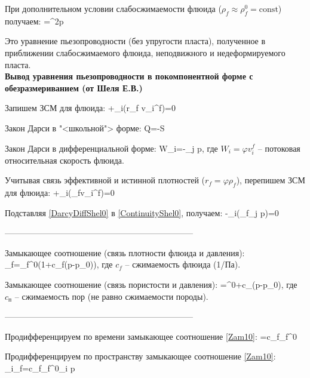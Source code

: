 \documentclass[main.tex]{subfiles}
\begin{document}
При дополнительном условии слабосжимаемости флюида ($\rho_f\approx\rho_f^0=\textrm{const}$) получаем:
\beq
{}=\pmb{\nabla}^2p
\eeq

Это уравнение пьезопроводности (без упругости пласта), полученное в приближении слабосжимаемого флюида, неподвижного и недеформируемого пласта.
\\

\textbf{Вывод уравнения пьезопроводности в покомпонентной форме с обезразмериванием (от Шеля Е.В.)}

Запишем ЗСМ для флюида:
\beq
{}+\partial_i\left(r_f v_i^f\right)=0
\eeq

Закон Дарси в "<школьной"> форме:
\beq
Q=-S
\eeq

Закон Дарси в дифференциальной форме:
\beq\label{DarcyDiffShel0}
W_i=-\partial_j p,
\eeq
где $W_i=\varphi v_i^f$ -- потоковая относительная скорость флюида.

Учитывая связь эффективной и истинной плотностей ($r_f=\varphi\rho_f$), перепишем ЗСМ для флюида:
\beq\label{ContinuityShel0}
+\partial_i\left(\rho_f\varphi v_i^f\right)=0
\eeq

Подставляя \eqref{DarcyDiffShel0} в \eqref{ContinuityShel0}, получаем:
\beq\label{GeneralPiezo0}
-\partial_i\left(\rho_f\partial_j p\right)=0
\eeq

--------------------------------------------------------------------

Замыкающее соотношение (связь плотности флюида и давления):
\beq\label{Zam10}
\rho_f=\rho_f^0\left(1+c_f\left(p-p_0\right)\right),
\eeq
где $c_f$ -- сжимаемость флюида (1/Па).


Замыкающее соотношение (связь пористости и давления):
\beq\label{Zam20}
\varphi=\varphi^0+c_{}\left(p-p_0\right),
\eeq
где $c_{\text{п}}$ -- сжимаемость пор (не равно сжимаемости породы).

--------------------------------------------------------------------

Продифференцируем по времени замыкающее соотношение \eqref{Zam10}:
\beq\label{DiffZam10}
=c_f\rho_f^0
\eeq

Продифференцируем по пространству замыкающее соотношение \eqref{Zam10}:
\beq\label{GradZam10}
\partial_i\rho_f=c_f\rho_f^0\partial_i p
\eeq
\end{document}
